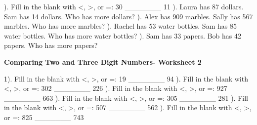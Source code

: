 \documentclass{article}%
\begin{document}
\newline%
). Fill in the blank with <, >, or =: 30 \_\_\_\_\_\_\_ 11%
\newline%
\newline%
). Laura has 87 dollars. Sam has 14 dollars. Who has more dollars?%
\newline%
\newline%
). Alex has 909 marbles. Sally has 567 marbles. Who has more marbles?%
\newline%
\newline%
). Rachel has 53 water bottles. Sam has 85 water bottles. Who has more water bottles?%
\newline%
\newline%
). Sam has 33 papers. Bob has 42 papers. Who has more papers?%
\newline%
\newline%
\newline%
\pagebreak%
\large%
\begin{center}%
\textbf{Comparing Two and Three Digit Numbers- Worksheet 2}%
\newline%
\end{center} \normalsize%
1). Fill in the blank with <, >, or =: 19 \_\_\_\_\_\_\_ 94%
\newline%
\newline%
). Fill in the blank with <, >, or =: 302 \_\_\_\_\_\_\_ 226%
\newline%
\newline%
). Fill in the blank with <, >, or =: 927 \_\_\_\_\_\_\_ 663%
\newline%
\newline%
). Fill in the blank with <, >, or =: 305 \_\_\_\_\_\_\_ 281%
\newline%
\newline%
). Fill in the blank with <, >, or =: 507 \_\_\_\_\_\_\_ 562%
\newline%
\newline%
). Fill in the blank with <, >, or =: 825 \_\_\_\_\_\_\_ 743%
\newline%
\end{document}
